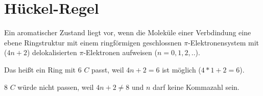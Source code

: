 \section{Hückel-Regel}
\label{sec:huckelregel}
Ein aromatischer Zustand liegt vor, 
wenn die Moleküle einer Verbdindung eine ebene Ringstruktur mit einem ringförmigen geschlossnen 
$\pi$-Elektronensystem mit ($4n + 2$) delokalisierten $\pi$-Elektronen aufweisen 
($n = 0,1,2,..$). 

Das heißt ein Ring mit $6$ $C$ passt, weil $4n + 2 = 6$ ist möglich ($4*1+2 = 6$).

$8$ $C$ würde nicht passen, weil $4n + 2 \neq 8$ und $n$ darf keine Kommazahl sein.


